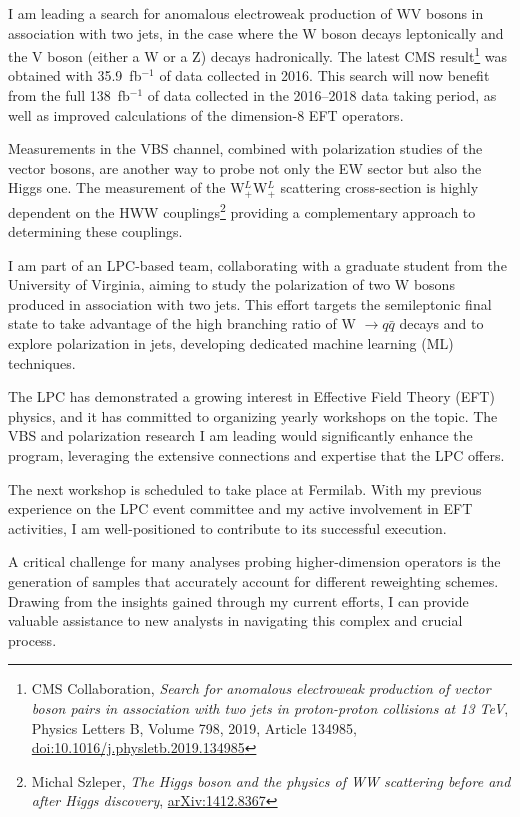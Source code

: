 {\begin{flushleft}
I am leading a search for anomalous electroweak production of WV bosons in association with two jets, in the case where the W boson decays leptonically and the V boson (either a W or a Z) decays hadronically.
The latest CMS result\footnote{CMS Collaboration, {\em Search for anomalous electroweak production of vector boson pairs in association with two jets in proton-proton collisions at 13 TeV}, Physics Letters B, Volume 798, 2019, Article 134985, \href{https://doi.org/10.1016/j.physletb.2019.134985}{doi:10.1016/j.physletb.2019.134985}} was obtained with 35.9~fb$^{-1}$ of data collected in 2016. This search will now benefit from the full 138~fb$^{-1}$ of data collected in the 2016--2018 data taking period, as well as improved calculations of the dimension-8 EFT operators.

Measurements in the VBS channel, combined with polarization studies of the vector bosons, are another way to probe not only the EW sector but also the Higgs one.
The measurement of the  W$^L_+$W$^L_+$ scattering cross-section is highly dependent on the HWW couplings\footnote{Michal Szleper, {\em The Higgs boson and the physics of WW scattering before and after Higgs discovery}, \href{https://arxiv.org/pdf/1412.8367}{arXiv:1412.8367}} providing a complementary approach to determining these couplings. 

I am part of an LPC-based team, collaborating with a graduate student from the University of Virginia, aiming to study the polarization of two W bosons produced in association with two jets. This effort targets the semileptonic final state to take advantage of the high branching ratio of W $\to q\bar{q}$ decays and to explore polarization in jets, developing dedicated machine learning (ML) techniques. 

\vspace{\baselineskip}
 
The LPC has demonstrated a growing interest in Effective Field Theory (EFT) physics, and it has committed to organizing yearly workshops on the topic. The VBS and polarization research I am leading would significantly enhance the program, leveraging the extensive connections and expertise that the LPC offers.

The next workshop is scheduled to take place at Fermilab. With my previous experience on the LPC event committee and my active involvement in EFT activities, I am well-positioned to contribute to its successful execution.

A critical challenge for many analyses probing higher-dimension operators is the generation of samples that accurately account for different reweighting schemes. Drawing from the insights gained through my current efforts, I can provide valuable assistance to new analysts in navigating this complex and crucial process.


\end{flushleft}}
